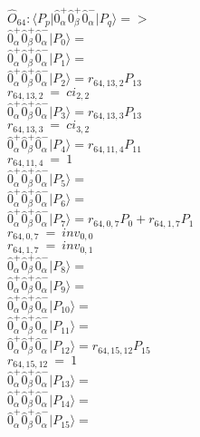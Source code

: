 \documentclass[14pt]{article}
\begin{document}
    $\hat{O}_{64}:  \langle{P_p}\vert \hat{0}_{\alpha}^{+}\hat{0}_{\beta}^{+}\hat{0}_{\alpha}^{-} \vert{P_q}\rangle => $ \\ 
    $ \hat{0}_{\alpha}^{+}\hat{0}_{\beta}^{+}\hat{0}_{\alpha}^{-} \vert{P_{0}}\rangle =  $ \\ 
    $ \hat{0}_{\alpha}^{+}\hat{0}_{\beta}^{+}\hat{0}_{\alpha}^{-} \vert{P_{1}}\rangle =  $ \\ 
    $ \hat{0}_{\alpha}^{+}\hat{0}_{\beta}^{+}\hat{0}_{\alpha}^{-} \vert{P_{2}}\rangle = {r}_{64,13,2}P_{13} $ \\ 
    ${r}_{64,13,2}\ =\ {ci}_{2,2} $ \\ 
    $ \hat{0}_{\alpha}^{+}\hat{0}_{\beta}^{+}\hat{0}_{\alpha}^{-} \vert{P_{3}}\rangle = {r}_{64,13,3}P_{13} $ \\ 
    ${r}_{64,13,3}\ =\ {ci}_{3,2} $ \\ 
    $ \hat{0}_{\alpha}^{+}\hat{0}_{\beta}^{+}\hat{0}_{\alpha}^{-} \vert{P_{4}}\rangle = {r}_{64,11,4}P_{11} $ \\ 
    ${r}_{64,11,4}\ =\ 1 $ \\ 
    $ \hat{0}_{\alpha}^{+}\hat{0}_{\beta}^{+}\hat{0}_{\alpha}^{-} \vert{P_{5}}\rangle =  $ \\ 
    $ \hat{0}_{\alpha}^{+}\hat{0}_{\beta}^{+}\hat{0}_{\alpha}^{-} \vert{P_{6}}\rangle =  $ \\ 
    $ \hat{0}_{\alpha}^{+}\hat{0}_{\beta}^{+}\hat{0}_{\alpha}^{-} \vert{P_{7}}\rangle = {r}_{64,0,7}P_{0}+{r}_{64,1,7}P_{1} $ \\ 
    ${r}_{64,0,7}\ =\ {inv}_{0,0} $ \\ 
    ${r}_{64,1,7}\ =\ {inv}_{0,1} $ \\ 
    $ \hat{0}_{\alpha}^{+}\hat{0}_{\beta}^{+}\hat{0}_{\alpha}^{-} \vert{P_{8}}\rangle =  $ \\ 
    $ \hat{0}_{\alpha}^{+}\hat{0}_{\beta}^{+}\hat{0}_{\alpha}^{-} \vert{P_{9}}\rangle =  $ \\ 
    $ \hat{0}_{\alpha}^{+}\hat{0}_{\beta}^{+}\hat{0}_{\alpha}^{-} \vert{P_{10}}\rangle =  $ \\ 
    $ \hat{0}_{\alpha}^{+}\hat{0}_{\beta}^{+}\hat{0}_{\alpha}^{-} \vert{P_{11}}\rangle =  $ \\ 
    $ \hat{0}_{\alpha}^{+}\hat{0}_{\beta}^{+}\hat{0}_{\alpha}^{-} \vert{P_{12}}\rangle = {r}_{64,15,12}P_{15} $ \\ 
    ${r}_{64,15,12}\ =\ 1 $ \\ 
    $ \hat{0}_{\alpha}^{+}\hat{0}_{\beta}^{+}\hat{0}_{\alpha}^{-} \vert{P_{13}}\rangle =  $ \\ 
    $ \hat{0}_{\alpha}^{+}\hat{0}_{\beta}^{+}\hat{0}_{\alpha}^{-} \vert{P_{14}}\rangle =  $ \\ 
    $ \hat{0}_{\alpha}^{+}\hat{0}_{\beta}^{+}\hat{0}_{\alpha}^{-} \vert{P_{15}}\rangle =  $ \\ 
    
\end{document}

